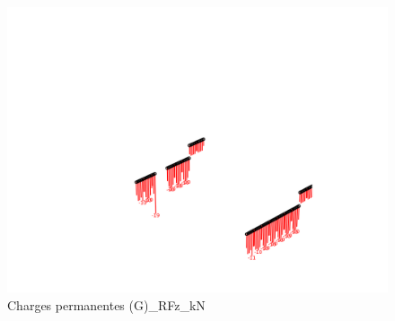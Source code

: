     \begin{figure}[H] %
        \centering %
        \includegraphics[width=\textwidth]{assets/img/graph3D_charges_cas_9_RFz_kN.png} %
        \caption{Charges permanentes (G)\_RFz\_kN} %
    \end{figure}

    